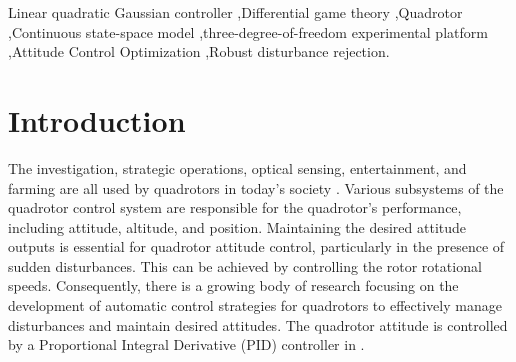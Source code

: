 \documentclass[3p,times]{elsarticle}
\begin{document}
\begin{frontmatter}
\begin{keyword}


Linear quadratic Gaussian controller \sep Differential game theory \sep Quadrotor \sep Continuous state-space model \sep three-degree-of-freedom experimental platform \sep Attitude Control Optimization \sep Robust disturbance rejection.

\end{keyword}

\end{frontmatter}


\section{Introduction}\label{sec:intro}
The investigation, strategic operations, optical sensing, entertainment, and farming are all used by quadrotors in today's society \cite{drones5030059}.
Various subsystems of the quadrotor control system are responsible for the quadrotor's performance, including attitude, altitude, and position.
Maintaining the desired attitude outputs is essential for quadrotor attitude control, particularly in the presence of sudden disturbances. This can be achieved by controlling the rotor rotational speeds\cite{article_Sharifi}.
Consequently, there is a growing body of research focusing on the development of automatic control strategies for quadrotors to effectively manage disturbances and maintain desired attitudes.
The quadrotor attitude is controlled by a Proportional Integral Derivative (PID) controller in \cite{article_Bolandi,article_Abdul}.
\end{document}
